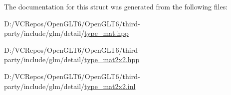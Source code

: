 The documentation for this struct was generated from the following files\+:\begin{DoxyCompactItemize}
\item 
D\+:/\+V\+C\+Repos/\+Open\+G\+L\+T6/\+Open\+G\+L\+T6/third-\/party/include/glm/detail/\mbox{\hyperlink{type__mat_8hpp}{type\+\_\+mat.\+hpp}}\item 
D\+:/\+V\+C\+Repos/\+Open\+G\+L\+T6/\+Open\+G\+L\+T6/third-\/party/include/glm/detail/\mbox{\hyperlink{type__mat2x2_8hpp}{type\+\_\+mat2x2.\+hpp}}\item 
D\+:/\+V\+C\+Repos/\+Open\+G\+L\+T6/\+Open\+G\+L\+T6/third-\/party/include/glm/detail/\mbox{\hyperlink{type__mat2x2_8inl}{type\+\_\+mat2x2.\+inl}}\end{DoxyCompactItemize}
